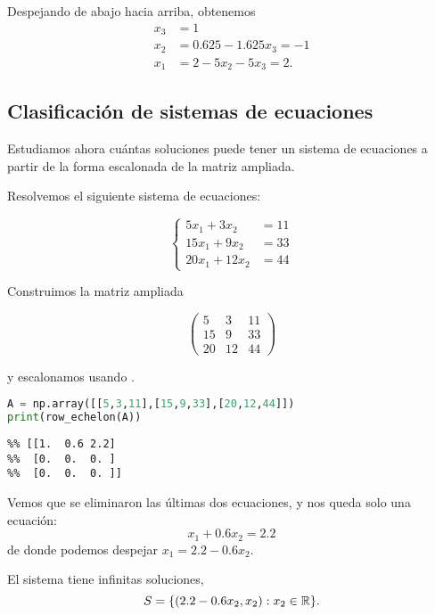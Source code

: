 Despejando de abajo hacia arriba, obtenemos
$$
\begin{aligned}
x_3 &= 1 \\
x_2 &= 0.625 - 1.625 x_3 = -1 \\
x_1 &= 2 - 5 x_2 - 5 x_3 = 2.
\end{aligned}
$$

\subsection{Clasificación de sistemas de ecuaciones}

Estudiamos ahora cuántas soluciones puede tener un sistema de ecuaciones a partir de la forma escalonada de la matriz ampliada.


\begin{ejemplo} Resolvemos el siguiente sistema de ecuaciones:

$$
\left\{\begin{aligned}
5x_1 + 3x_2 &= 11 \\
15x_1 + 9x_2 &= 33 \\
20x_1 + 12x_2 &= 44
\end{aligned}\right.
$$

Construimos la matriz ampliada

$$
\left(\begin{array}{rr|r}5&3&11\\15&9&33\\20&12&44\end{array}\right)
$$

y escalonamos usando \python.

\begin{Shaded}
\begin{lstlisting}[language=Python]
A = np.array([[5,3,11],[15,9,33],[20,12,44]])
print(row_echelon(A))
\end{lstlisting}
\end{Shaded}

\begin{verbatim}
%% [[1.  0.6 2.2]
%%  [0.  0.  0. ]
%%  [0.  0.  0. ]]
\end{verbatim}
Vemos que se eliminaron las últimas dos ecuaciones, y nos queda solo una
ecuación:
$$
x_1 + 0.6 x_2 = 2.2
$$
de donde podemos despejar $x_1 = 2.2 - 0.6x_2$.

El sistema tiene infinitas soluciones,
$$S = \{(2.2 - 0.6x_2, x_2): x_2 \in \mathbb R\}.$$
\end{ejemplo}



